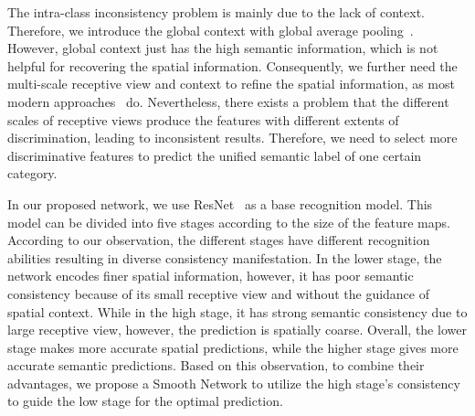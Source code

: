 \documentclass[10pt,twocolumn,letterpaper]{article}
\begin{document}
The intra-class inconsistency problem is mainly due to the lack of context. Therefore, we introduce the global context with global average pooling~\cite{Liu-ICLR-ParseNet-2016, Lin-ICLR-NIN-2013, Zhao-CVPR-PSPNet-2017, Chen-Arxiv-Deeplabv3-2017}. However, global context just has the high semantic information, which is not helpful for recovering the spatial information. Consequently, we further need the multi-scale receptive view and context to refine the spatial information, as most modern approaches~\cite{Zhao-CVPR-PSPNet-2017,Chen-Arxiv-Deeplabv3-2017, Peng-CVPR-Largekernl-2017} do. Nevertheless, there exists a problem that the different scales of receptive views produce the features with different extents of discrimination, leading to inconsistent results. Therefore, we need to select more discriminative features to predict the unified semantic label of one certain category. 

In our proposed network, we use ResNet~\cite{He-CVPR-ResNet-2016} as a base recognition model. This model can be divided into five stages according to the size of the feature maps. According to our observation, the different stages have different recognition abilities resulting in diverse consistency manifestation. In the lower stage, the network encodes finer spatial information, however, it has poor semantic consistency because of its small receptive view and without the guidance of spatial context. While in the high stage, it has strong semantic consistency due to large receptive view, however, the prediction is spatially coarse. Overall, the lower stage makes more accurate spatial predictions, while the higher stage gives more accurate semantic predictions. Based on this observation, to combine their advantages, we propose a Smooth Network to utilize the high stage's consistency to guide the low stage for the optimal prediction.
\end{document}
